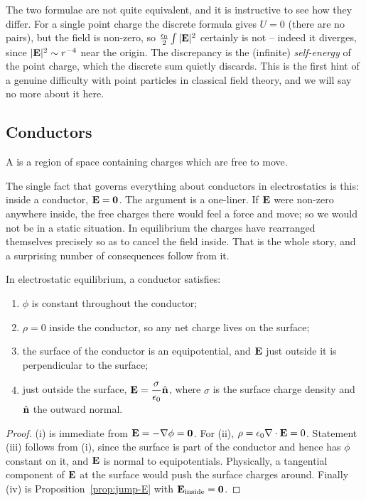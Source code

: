 \documentclass[a4paper]{scrartcl}
\newcommand{\hh}[1]{\hat{\vv{#1}}}
\begin{document}
\begin{remark}
	The two formulae are not quite equivalent, and it is instructive to see how they differ. For a single point charge the discrete formula gives $U = 0$ (there are no pairs), but the field is non-zero, so $\frac{\epsilon_0}{2}\int|\mathbf{E}|^2$ certainly is not -- indeed it diverges, since $|\mathbf{E}|^2 \sim r^{-4}$ near the origin. The discrepancy is the (infinite) \emph{self-energy} of the point charge, which the discrete sum quietly discards. This is the first hint of a genuine difficulty with point particles in classical field theory, and we will say no more about it here.
\end{remark}

\subsection{Conductors}

\begin{definition}[Conductor]
	A  is a region of space containing charges which are free to move.
\end{definition}

The single fact that governs everything about conductors in electrostatics is this: inside a conductor, $\mathbf{E} = \mathbf{0}$. The argument is a one-liner. If $\mathbf{E}$ were non-zero anywhere inside, the free charges there would feel a force and move; so we would not be in a static situation. In equilibrium the charges have rearranged themselves precisely so as to cancel the field inside. That is the whole story, and a surprising number of consequences follow from it.

\begin{proposition}
	In electrostatic equilibrium, a conductor satisfies:
	\begin{enumerate}[label=(\roman*)]
		\item $\phi$ is constant throughout the conductor;
		\item $\rho = 0$ inside the conductor, so any net charge lives on the surface;
		\item the surface of the conductor is an equipotential, and $\mathbf{E}$ just outside it is perpendicular to the surface;
		\item just outside the surface, $\vv{E} = \dfrac{\sigma}{\epsilon_0}\hh{n}$, where $\sigma$ is the surface charge density and $\hh{n}$ the outward normal.
	\end{enumerate}
\end{proposition}
\begin{proof}
	(i) is immediate from $\mathbf{E} = -\nabla\phi = \mathbf{0}$. For (ii), $\rho = \epsilon_0 \nabla\cdot \mathbf{E} = 0$. Statement (iii) follows from (i), since the surface is part of the conductor and hence has $\phi$ constant on it, and $\mathbf{E}$ is normal to equipotentials. Physically, a tangential component of $\mathbf{E}$ at the surface would push the surface charges around. Finally (iv) is Proposition~\ref{prop:jump-E} with $\mathbf{E}_{\text{inside}} = \mathbf{0}$.
\end{proof}
\end{document}
